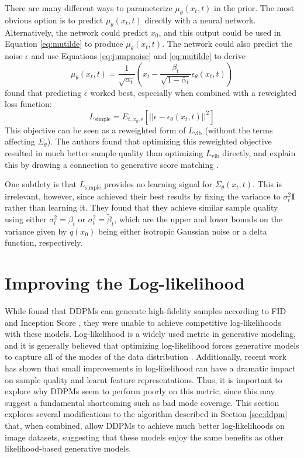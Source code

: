 \documentclass{article}
\begin{document}
There are many different ways to parameterize $\mu_{\theta}(x_t, t)$ in the prior. The most obvious option is to predict $\mu_{\theta}(x_t, t)$ directly with a neural network. Alternatively, the network could predict $x_0$, and this output could be used in Equation \ref{eq:mutilde} to produce $\mu_{\theta}(x_t, t)$. The network could also predict the noise $\epsilon$ and use Equations \ref{eq:jumpnoise} and \ref{eq:mutilde} to derive
\begin{equation}
\mu_{\theta}(x_t, t) = \frac{1}{\sqrt{\alpha_t}} \left( x_t - \frac{\beta_t}{\sqrt{1-\bar{\alpha}_t}} \epsilon_{\theta}(x_t, t) \right)
\end{equation}
\citet{ddpm} found that predicting $\epsilon$ worked best, especially when combined with a reweighted loss function:
\begin{equation}
L_{\text{simple}} = E_{t,x_0,\epsilon}\left[ || \epsilon - \epsilon_{\theta}(x_t, t) ||^2 \right]
\end{equation}
This objective can be seen as a reweighted form of $L_{\text{vlb}}$ (without the terms affecting $\Sigma_{\theta}$). The authors found that optimizing this reweighted objective resulted in much better sample quality than optimizing $L_{\text{vlb}}$ directly, and explain this by drawing a connection to generative score matching \citep{scorematching,improvedscore}.

One subtlety is that $L_{\text{simple}}$ provides no learning signal for $\Sigma_{\theta}(x_t, t)$. This is irrelevant, however, since \citet{ddpm} achieved their best results by fixing the variance to $\sigma_t^2 \mathbf{I}$ rather than learning it. They found that they achieve similar sample quality using either $\sigma_t^2 = \beta_t$ or $\sigma_t^2 = \tilde{\beta}_t$, which are the upper and lower bounds on the variance given by $q(x_0)$ being either isotropic Gaussian noise or a delta function, respectively.

\section{Improving the Log-likelihood}
\label{sec:improvinglikelihood}

While \citet{ddpm} found that DDPMs can generate high-fidelity samples according to FID \citep{fid} and Inception Score \citep{inceptionscore}, they were unable to achieve competitive log-likelihoods with these models. Log-likelihood is a widely used metric in generative modeling, and it is generally believed that optimizing log-likelihood forces generative models to capture all of the modes of the data distribution \citep{vqvae2}. Additionally, recent work \citep{scalingcompendium} has shown that small improvements in log-likelihood can have a dramatic impact on sample quality and learnt feature representations. Thus, it is important to explore why DDPMs seem to perform poorly on this metric, since this may suggest a fundamental shortcoming such as bad mode coverage. This section explores several modifications to the algorithm described in Section \ref{sec:ddpm} that, when combined, allow DDPMs to achieve much better log-likelihoods on image datasets, suggesting that these models enjoy the same benefits as other likelihood-based generative models.
\end{document}
